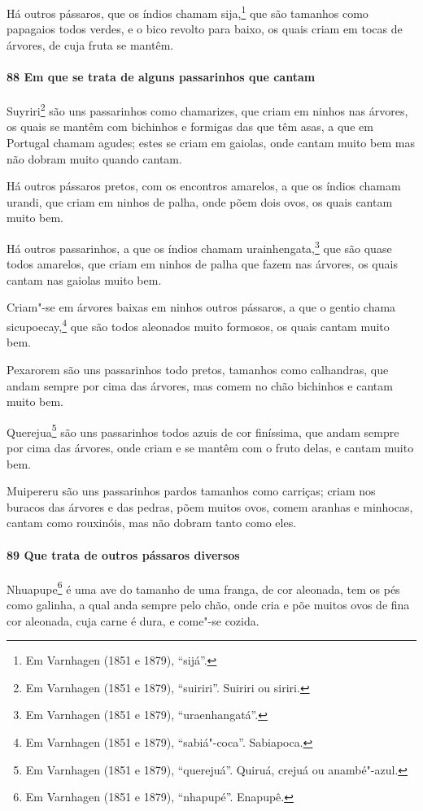 \begin{linenumbers}
Há outros pássaros, que os índios chamam sija,\footnote{ Em Varnhagen (1851 e 1879),
``sijá''.} que são tamanhos como papagaios todos verdes, e o bico revolto para baixo, os
quais criam em tocas de árvores, de cuja fruta se mantêm.

\paragraph{88 Em que se trata de alguns passarinhos que cantam}\quad
Suyriri\footnote{ Em Varnhagen (1851 e 1879), ``suiriri''. Suiriri ou siriri.} são uns
passarinhos como chamarizes, que criam em ninhos nas árvores, os quais se mantêm com
bichinhos e formigas das que têm asas, a que em Portugal chamam agudes; estes se criam em
gaiolas, onde cantam muito bem mas não dobram muito quando cantam.

Há outros pássaros pretos, com os encontros amarelos, a que os índios chamam urandi, que
criam em ninhos de palha, onde põem dois ovos, os quais cantam muito bem.

Há outros passarinhos, a que os índios chamam urainhengata,\footnote{ Em Varnhagen (1851 e
1879), ``uraenhangatá''.} que são quase todos amarelos, que criam em ninhos de palha que
fazem nas árvores, os quais cantam nas gaiolas muito bem.

Criam"-se em árvores baixas em ninhos outros pássaros, a que o gentio chama
sicupoecay,\footnote{ Em Varnhagen (1851 e 1879), ``sabiá"-coca''. Sabiapoca.} que são
todos aleonados muito formosos, os quais cantam muito bem.


Pexarorem são uns passarinhos todo pretos, tamanhos como calhandras, que andam sempre por
cima das árvores, mas comem no chão bichinhos e cantam muito bem.

Querejua\footnote{ Em Varnhagen (1851 e 1879), ``querejuá''. Quiruá, crejuá ou
anambé"-azul.} são uns passarinhos todos azuis de cor finíssima, que andam sempre por cima
das árvores, onde criam e se mantêm com o fruto delas, e cantam muito bem.

Muipereru são uns passarinhos pardos tamanhos como carriças; criam nos buracos das árvores
e das pedras, põem muitos ovos, comem aranhas e minhocas, cantam como rouxinóis, mas não
dobram tanto como eles.

\paragraph{89 Que trata de outros pássaros diversos}\quad
Nhuapupe\footnote{ Em Varnhagen (1851 e 1879), ``nhapupé''. Enapupê.} é uma ave do tamanho
de uma franga, de cor aleonada, tem os pés como galinha, a qual anda sempre pelo chão,
onde cria e põe muitos ovos de fina cor aleonada, cuja carne é dura, e come"-se cozida.


\end{linenumbers}

